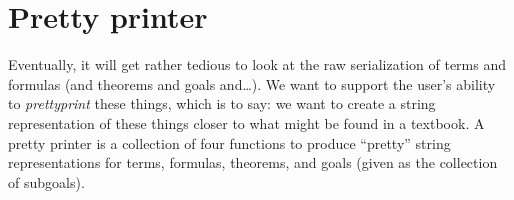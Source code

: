 \begin{node}
\end{node}
\nwenddocs{}%

\section{Pretty printer}

\begin{node}
Eventually, it will get rather tedious to look at the raw serialization of
terms and formulas (and theorems and goals and\dots). We want to
support the user's ability to \emph{prettyprint} these things, which
is to say: we want to create a string representation of these things
closer to what might be found in a textbook. A pretty printer is a
collection of four functions to produce ``pretty'' string
representations for terms, formulas, theorems, and goals (given as the
collection of subgoals).
\end{node}

